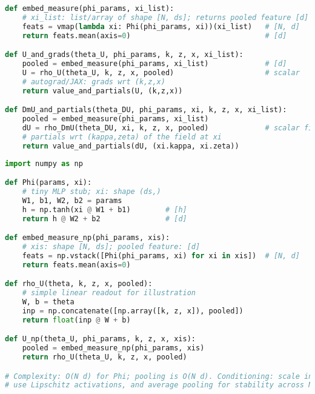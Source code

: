 ﻿\documentclass[11pt,letterpaper,oneside]{article}
\numberwithin{equation}{section}
\newcommand{\1}{\mathbf{1}}
\begin{document}
\begin{tcolorbox}[didacticstyle]
\begin{itemize}[leftmargin=1.1em,itemsep=0.25em]
\begin{lstlisting}[language=Python,caption={DeepSets-style pooling for U and D\_m U (pseudo-JAX)}]
def embed_measure(phi_params, xi_list):
    # xi_list: list/array of shape [N, ds]; returns pooled feature [d]
    feats = vmap(lambda xi: Phi(phi_params, xi))(xi_list)   # [N, d]
    return feats.mean(axis=0)                               # [d]

def U_and_grads(theta_U, phi_params, k, z, x, xi_list):
    pooled = embed_measure(phi_params, xi_list)             # [d]
    U = rho_U(theta_U, k, z, x, pooled)                     # scalar
    # autograd/JAX: grads wrt (k,z,x)
    return value_and_partials(U, (k,z,x))

def DmU_and_partials(theta_DU, phi_params, xi, k, z, x, xi_list):
    pooled = embed_measure(phi_params, xi_list)
    dU = rho_DmU(theta_DU, xi, k, z, x, pooled)             # scalar field at xi
    # partials wrt (kappa,zeta) of the field at xi
    return value_and_partials(dU, (xi.kappa, xi.zeta))
\end{lstlisting}

\begin{lstlisting}[language=Python,caption={Minimal NumPy sketch (DeepSets pooling and readout)}]
import numpy as np

def Phi(params, xi):
    # tiny MLP stub; xi: shape (ds,)
    W1, b1, W2, b2 = params
    h = np.tanh(xi @ W1 + b1)        # [h]
    return h @ W2 + b2               # [d]

def embed_measure_np(phi_params, xis):
    # xis: shape [N, ds]; pooled feature: [d]
    feats = np.vstack([Phi(phi_params, xi) for xi in xis])  # [N, d]
    return feats.mean(axis=0)

def rho_U(theta, k, z, x, pooled):
    # simple linear readout for illustration
    W, b = theta
    inp = np.concatenate([np.array([k, z, x]), pooled])
    return float(inp @ W + b)

def U_np(theta_U, phi_params, k, z, x, xis):
    pooled = embed_measure_np(phi_params, xis)
    return rho_U(theta_U, k, z, x, pooled)

# Complexity: O(N d) for Phi; pooling is O(N d). Conditioning: scale inputs,
# use Lipschitz activations, and average pooling for stability across N.
\end{lstlisting}


\end{itemize}
\end{tcolorbox}
\end{document}

